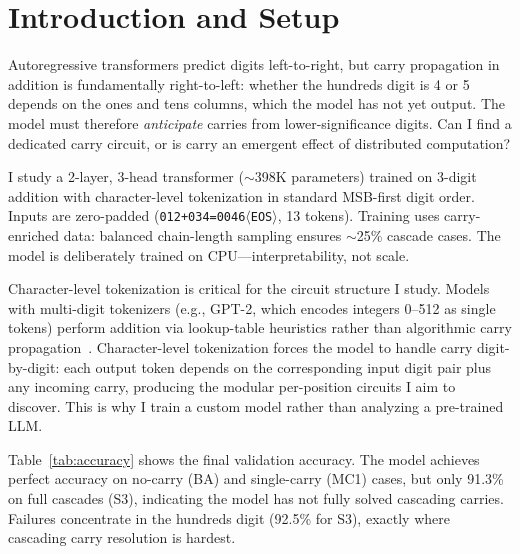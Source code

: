 \documentclass{article}
\begin{document}

\section{Introduction and Setup}
\label{sec:intro}

Autoregressive transformers predict digits left-to-right, but carry propagation in addition is fundamentally right-to-left: whether the hundreds digit is 4 or 5 depends on the ones and tens columns, which the model has not yet output.
The model must therefore \emph{anticipate} carries from lower-significance digits.
Can I find a dedicated carry circuit, or is carry an emergent effect of distributed computation?

I study a 2-layer, 3-head transformer (${\sim}$398K parameters) trained on 3-digit addition with character-level tokenization in standard MSB-first digit order.
Inputs are zero-padded (\texttt{012+034=0046$\langle$EOS$\rangle$}, 13 tokens).
Training uses carry-enriched data: balanced chain-length sampling ensures ${\sim}$25\% cascade cases.
The model is deliberately trained on CPU---interpretability, not scale.

Character-level tokenization is critical for the circuit structure I study.
Models with multi-digit tokenizers (e.g., GPT-2, which encodes integers 0--512 as single tokens) perform addition via lookup-table heuristics rather than algorithmic carry propagation~\citep{nikankin2024arithmetic}.
Character-level tokenization forces the model to handle carry digit-by-digit: each output token depends on the corresponding input digit pair plus any incoming carry, producing the modular per-position circuits I aim to discover.
This is why I train a custom model rather than analyzing a pre-trained LLM.

Table~\ref{tab:accuracy} shows the final validation accuracy.
The model achieves perfect accuracy on no-carry (BA) and single-carry (MC1) cases, but only 91.3\% on full cascades (S3), indicating the model has not fully solved cascading carries.
Failures concentrate in the hundreds digit (92.5\% for S3), exactly where cascading carry resolution is hardest.
\end{document}
